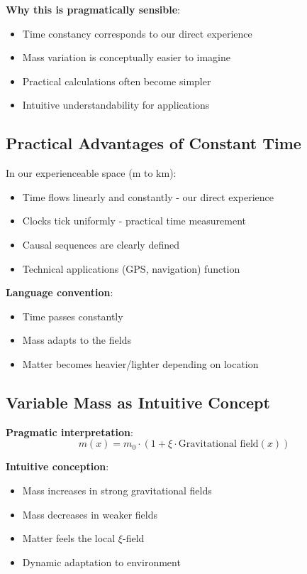 \documentclass[12pt,a4paper]{article}
\newcommand{\xipar}{\xi}
\theoremstyle{definition}
\theoremstyle{remark}
\begin{document}
	\textbf{Why this is pragmatically sensible}:
	\begin{itemize}
		\item Time constancy corresponds to our direct experience
		\item Mass variation is conceptually easier to imagine
		\item Practical calculations often become simpler
		\item Intuitive understandability for applications
	\end{itemize}
	
	\subsection{Practical Advantages of Constant Time}
	
	In our experienceable space (m to km):
	\begin{itemize}
		\item Time flows linearly and constantly - our direct experience
		\item Clocks tick uniformly - practical time measurement
		\item Causal sequences are clearly defined
		\item Technical applications (GPS, navigation) function
	\end{itemize}
	
	\textbf{Language convention}:
	\begin{itemize}
		\item Time passes constantly
		\item Mass adapts to the fields
		\item Matter becomes heavier/lighter depending on location
	\end{itemize}
	
	\subsection{Variable Mass as Intuitive Concept}
	
	\textbf{Pragmatic interpretation}:
	\begin{equation}
		m(x) = m_0 \cdot (1 + \xipar \cdot \text{Gravitational field}(x))
	\end{equation}
	
	\textbf{Intuitive conception}:
	\begin{itemize}
		\item Mass increases in strong gravitational fields
		\item Mass decreases in weaker fields
		\item Matter feels the local $\xipar$-field
		\item Dynamic adaptation to environment
	\end{itemize}
	
\end{document}
